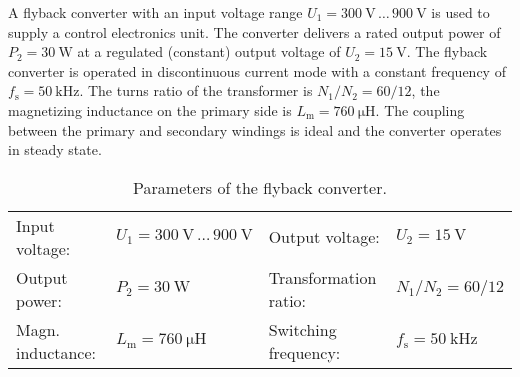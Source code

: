 

A flyback converter with an input voltage range $U_\mathrm{1} = \SI{300}{\volt} \, \dots \, \SI{900}{\volt}$ is used to supply a control electronics unit. The converter delivers a rated output power of  $P_\mathrm{2} = \SI{30}{\watt}$ at a regulated (constant) output voltage of  $U_\mathrm{2} = \SI{15}{\volt}$. The flyback converter is operated in discontinuous current mode with a constant frequency of  $f_\mathrm{s} = \SI{50}{\kilo\hertz}$. The turns ratio of the transformer is $N_\mathrm{1}/N_\mathrm{2}=60/12$, the magnetizing inductance on the primary side is $L_\mathrm{m} = \SI{760}{\micro\henry}$. The coupling between the primary and secondary windings is ideal and the converter operates in steady state.



\begin{table}[ht]
    \centering  %
    \begin{tabular}{llll}
        \toprule
        
        Input voltage: &  $U_{\mathrm{1}} = \SI{300}{\volt} \, \dots \, \SI{900}{\volt}$ & Output voltage: & $U_{\mathrm{2}} = \SI{15}{\volt}$ \\ 
        Output power: & $P_2 = \SI{30}{\watt}$  & Transformation ratio: & $N_\mathrm{1}/N_\mathrm{2}=60/12$ \\ 
        Magn. inductance: & $L_\mathrm{m} = \SI{760}{\micro\henry}$ & Switching frequency: & $f_{\mathrm{s}} = \SI{50}{\kilo\hertz}$ \\ 
        \bottomrule
    \end{tabular}
    \caption{Parameters of the flyback converter.}  %
    \label{table:ex04_Parameters of the circuit}
\end{table}


